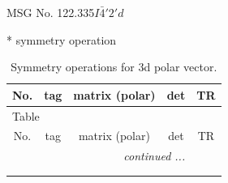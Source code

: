 \documentclass[fleqn,8pt]{jsarticle}
\begin{document}
\setcounter{MaxMatrixCols}{32}

\renewcommand{\tablename}{Table~}
\renewcommand{\figurename}{Figure~}
\begin{center}
\LARGE
MSG No. 122.335\quad$I\bar{4}'2'd$
\end{center}
* symmetry operation
\renewcommand{\arraystretch}{1.3}
\begin{longtable}{ccccc}
\caption{Symmetry operations for 3d polar vector.}
 \\
 \hline \hline
No. & tag & matrix (polar) & det & TR \\ \hline \endfirsthead

\multicolumn{4}{l}{\tablename\ \thetable{}} \\
 \hline \hline
No. & tag & matrix (polar) & det & TR \\ \hline \endhead

 \hline \hline
\multicolumn{4}{r}{\footnotesize\it continued ...} \\ \endfoot

 \hline \hline
\multicolumn{4}{r}{} \\ \endlastfoot


\end{longtable}
\end{document}
